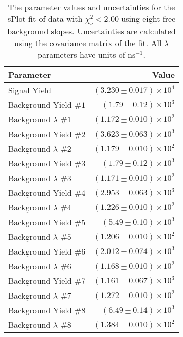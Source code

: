 
\begin{table}[ht]
    \begin{center}
        \begin{tabular}{lr}\toprule
            Parameter & Value \\\midrule
            Signal Yield & $(3.230 \pm 0.017) \times 10^{4}$ \\
            Background Yield $\#1$ & $(1.79 \pm 0.12) \times 10^{3}$ \\
            Background $\lambda$ $\#1$ & $(1.172 \pm 0.010) \times 10^{2}$ \\
            Background Yield $\#2$ & $(3.623 \pm 0.063) \times 10^{3}$ \\
            Background $\lambda$ $\#2$ & $(1.179 \pm 0.010) \times 10^{2}$ \\
            Background Yield $\#3$ & $(1.79 \pm 0.12) \times 10^{3}$ \\
            Background $\lambda$ $\#3$ & $(1.171 \pm 0.010) \times 10^{2}$ \\
            Background Yield $\#4$ & $(2.953 \pm 0.063) \times 10^{3}$ \\
            Background $\lambda$ $\#4$ & $(1.226 \pm 0.010) \times 10^{2}$ \\
            Background Yield $\#5$ & $(5.49 \pm 0.10) \times 10^{3}$ \\
            Background $\lambda$ $\#5$ & $(1.206 \pm 0.010) \times 10^{2}$ \\
            Background Yield $\#6$ & $(2.012 \pm 0.074) \times 10^{3}$ \\
            Background $\lambda$ $\#6$ & $(1.168 \pm 0.010) \times 10^{2}$ \\
            Background Yield $\#7$ & $(1.161 \pm 0.067) \times 10^{3}$ \\
            Background $\lambda$ $\#7$ & $(1.272 \pm 0.010) \times 10^{2}$ \\
            Background Yield $\#8$ & $(6.49 \pm 0.14) \times 10^{3}$ \\
            Background $\lambda$ $\#8$ & $(1.384 \pm 0.010) \times 10^{2}$ \\\bottomrule
        \end{tabular}
        \caption{The parameter values and uncertainties for the sPlot fit of data with $\chi^2_\nu < 2.00$ using eight free background slopes. Uncertainties are calculated using the covariance matrix of the fit. All $\lambda$ parameters have units of $\si{\nano\second}^{-1}$.}\label{tab:splot-fit-results-chisqdof-2.00-free-8}
    \end{center}
\end{table}
